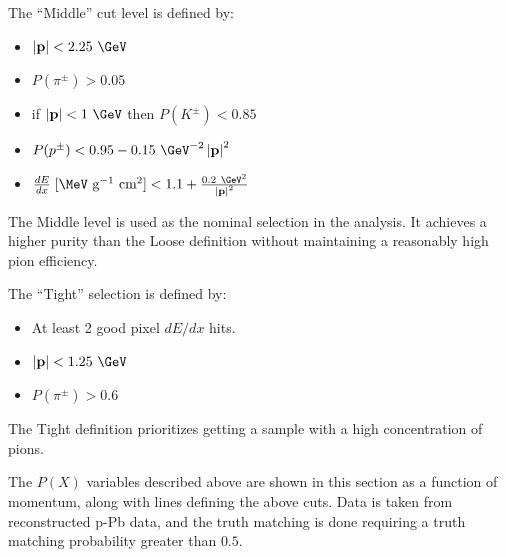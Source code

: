 The ``Middle'' cut level is defined by:
\begin{itemize}
\item %
  $\left|\mathbf{p}\right| < 2.25~\GeV$
\item
  $P(\pi^{\pm}) > 0.05$
\item
  if $\left|\mathbf{p}\right| < 1~\GeV$ then $P(K^{\pm}) < 0.85$
\item
  $P(p^{\pm}) < 0.95 - 0.15~\GeV^{-2}\left|\mathbf{p}\right|^{2}$
\item
  $\frac{dE}{dx} \; [\MeV \textrm{ g}^{-1} \textrm{ cm}^{2}]< 1.1 + \frac{0.2~\GeV^2}{\left|\mathbf{p}\right|^{2}}$
\end{itemize}
The Middle level is used as the nominal selection in the analysis. It achieves a higher purity than the Loose definition without maintaining a reasonably high pion efficiency.

The ``Tight'' selection is defined by:
\begin{itemize}
\item
  At least 2 good pixel $dE/dx$ hits.
\item
  $\left|\mathbf{p}\right| < 1.25~\GeV$
\item
  $P(\pi^{\pm}) > 0.6$
\end{itemize}
The Tight definition prioritizes getting a sample with a high concentration of pions.

The $P(X)$ variables described above are shown in this section as a function of momentum, along with lines defining the above cuts.
Data is taken from reconstructed \Hijing p-Pb data, and the truth matching is done requiring a truth matching probability greater than $0.5$.

